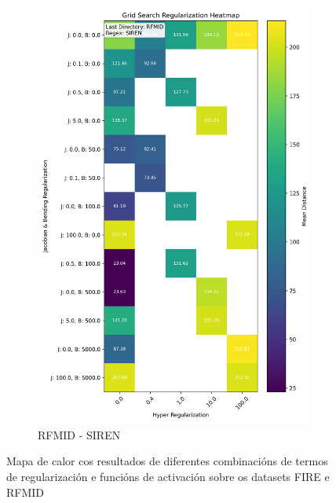 \begin{figure}[ht]
\begin{subfigure}[b]{0.4\textwidth}
        \includegraphics[width=\textwidth]{imaxes/grid_search_single_heatmap_RFMID_SIREN.png}
        \caption{RFMID - SIREN}
        \label{fig:gs_single_RFMID_SIREN}
    \end{subfigure}
    
    \caption{Mapa de calor cos resultados de diferentes combinacións de termos de regularización e funcións de activación sobre os datasets FIRE e RFMID}
    \label{fig:gs_single_heatmaps}
\end{figure}

\FloatBarrier